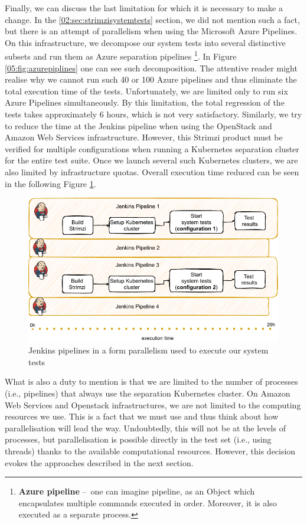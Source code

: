 Finally, we can discuss the last limitation for which it is necessary to make a change. In the \ref{02:sec:strimzisystemtests} section, we did not mention such a fact, but there is an attempt of parallelism when using the Microsoft Azure Pipelines. On this infrastructure, we decompose our system tests into several distinctive subsets and run them as Azure separation pipelines \footnote{\textbf{Azure pipeline} \---\ one can imagine pipeline, as an Object which encapsulates multiple commands executed in order. Moreover, it is also executed as a separate process.}. In Figure \ref{05:fig:azurepiplines} one can see such decomposition. The attentive reader might realise why we cannot run such 40 or 100 Azure pipelines and thus eliminate the total execution time of the tests. Unfortunately, we are limited only to run six Azure Pipelines simultaneously. By this limitation, the total regression of the tests takes approximately 6 hours, which is not very satisfactory. Similarly, we try to reduce the time at the Jenkins pipeline when using the OpenStack and Amazon Web Services infrastructure. However, this Strimzi product must be verified for multiple configurations when running a Kubernetes separation cluster for the entire test suite. Once we launch several such Kubernetes clusters, we are also limited by infrastructure quotas. Overall execution time reduced can be seen in the following Figure \ref{05:fig:jenkinspipelines}. 
\begin{figure}[!ht]
    \centering
    \includegraphics[scale=0.8]{obrazky-figures/06-proposal-of-parallel-approach/02-jenkins-smaller.pdf}
    \caption{Jenkins pipelines in a form parallelism used to execute our system tests}
    \label{05:fig:jenkinspipelines}
\end{figure}

What is also a duty to mention is that we are limited to the number of processes (i.e., pipelines) that always use the separation Kubernetes cluster. On Amazon Web Services and Openstack infrastructures, we are not limited to the computing resources we use. This is a fact that we must use and thus think about how parallelisation will lead the way. Undoubtedly, this will not be at the levels of processes, but parallelisation is possible directly in the test set (i.e., using threads) thanks to the available computational resources. However, this decision evokes the approaches described in the next section.

